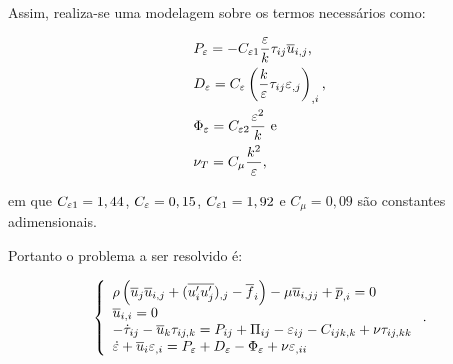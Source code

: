 \documentclass[_ArquivoPrincipal.tex]{subfiles}
\begin{document}
\begin{comment}
Já o tensor de Reynolds pode ser subdividido em duas parcelas: uma parte isotrópica ($\tau_{ij}^I$) e outra desviadora ($\tau_{ij}^D$), ou seja:

\begin{equation}
    \tau_{ij}=\tau_{ij}^I+\tau_{ij}^D\text{,}
\end{equation}

\noindent em que:

\begin{subequations}
    \begin{align}
         & \tau_{ij}^I=-\frac{2}{3}k\delta_{ij}\text{ e} \\
         & \tau_{ij}^D=2\nu_T\epmean_{ij}\text{,}
    \end{align}
\end{subequations}

\noindent $\epmean_{ij}$ é a taxa de deformação do campo de velocidades média:

\begin{equation}
    \epmean_{ij}=\frac{\bar{u}_{i,j}+\bar{u}_{j,i}}{2}
\end{equation}

\noindent e $\nu_T$ é a viscosidade de vórtice.
\end{comment}

Assim, realiza-se uma modelagem sobre os termos necessários como:

\begin{subequations}
    \begin{align}
         & P_\varepsilon=-C_{\varepsilon 1}\frac{\varepsilon}{k}\tau_{ij}\overline{u}_{i,j}\text{,}     \\
         & D_\varepsilon=C_\varepsilon\left({\frac{k}{\varepsilon}\tau_{ij}\varepsilon_{,j}}\right)_{,i}\text{,} \\
         & \Phi_\varepsilon=C_{\varepsilon 2}\frac{\varepsilon^2}{k}\text{ e}                      \\
         & \nu_T=C_\mu\frac{k^2}{\varepsilon}\text{,}
    \end{align}
\end{subequations}

\noindent em que $C_{\varepsilon 1}=1,44$, $C_\varepsilon=0,15$, $C_{\varepsilon 1}=1,92$ e $C_\mu=0,09$ são constantes adimensionais.

Portanto o problema a ser resolvido é:

\begin{equation}
    \left\{
    \begin{array}{l}
        \rho\left({\overline{u}_j\overline{u}_{i,j}+(\overline{u'_iu'_j})_{,j}-\overline{f}_i}\right)-\mu\overline{u}_{i,jj}+\overline{p}_{,i}=0 \\
        \overline{u}_{i,i}=0                                                                                      \\
        -\dot{\tau}_{ij}-\overline{u}_k\tau_{ij,k}=P_{ij}+\Pi_{ij}-\varepsilon_{ij}-C_{ijk,k}+\nu\tau_{ij,kk}     \\
        \dot{\varepsilon}+\overline{u}_i\varepsilon_{,i}=P_\varepsilon+D_\varepsilon-\Phi_\varepsilon+\nu\varepsilon_{,ii}
    \end{array}
    \right.\text{.}
\end{equation}
\end{document}
